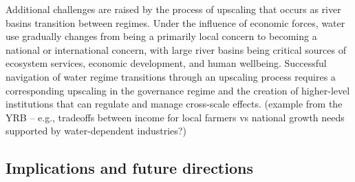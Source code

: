 \documentclass[9pt, twocolumn, twoside, lineno]{pnas-new}
\begin{document}
Additional challenges are raised by the process of upscaling that occurs as river basins transition between regimes. Under the influence of economic forces, water use gradually changes from being a primarily local concern to becoming a national or international concern, with large river basins being critical sources of ecosystem services, economic development, and human wellbeing. Successful navigation of water regime transitions through an upscaling process requires a corresponding upscaling in the governance regime and the creation of higher-level institutions that can regulate and manage cross-scale effects. (example from the YRB – e.g., tradeoffs between income for local farmers vs national growth needs supported by water-dependent industries?)

\subsection*{Implications and future directions}
\label{Outlook}
\end{document}
